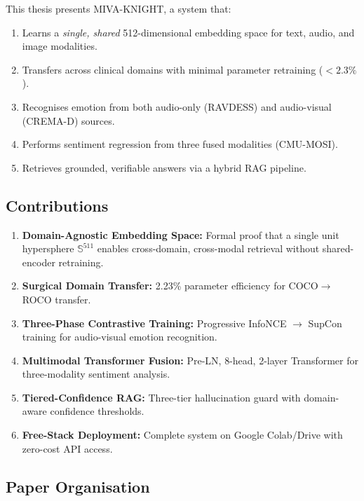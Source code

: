 \documentclass[12pt,a4paper]{article}
\theoremstyle{definition}
\theoremstyle{plain}
\theoremstyle{remark}
\newcommand{\Sph}{\mathbb{S}}
\begin{document}
This thesis presents MIVA-KNIGHT, a system that:
\begin{enumerate}
  \item Learns a \emph{single, shared} 512-dimensional embedding space for text, audio, and image modalities.
  \item Transfers across clinical domains with minimal parameter retraining ($< 2.3\%$).
  \item Recognises emotion from both audio-only (RAVDESS) and audio-visual (CREMA-D) sources.
  \item Performs sentiment regression from three fused modalities (CMU-MOSI).
  \item Retrieves grounded, verifiable answers via a hybrid RAG pipeline.
\end{enumerate}

\subsection{Contributions}

\begin{tcolorbox}[keybox,title={Summary of Contributions}]
\begin{enumerate}[label=\textbf{C\arabic*.}]
  \item \textbf{Domain-Agnostic Embedding Space:} Formal proof that a single unit hypersphere $\Sph^{511}$ enables cross-domain, cross-modal retrieval without shared-encoder retraining.
  \item \textbf{Surgical Domain Transfer:} 2.23\% parameter efficiency for COCO$\to$ROCO transfer.
  \item \textbf{Three-Phase Contrastive Training:} Progressive InfoNCE $\to$ SupCon training for audio-visual emotion recognition.
  \item \textbf{Multimodal Transformer Fusion:} Pre-LN, 8-head, 2-layer Transformer for three-modality sentiment analysis.
  \item \textbf{Tiered-Confidence RAG:} Three-tier hallucination guard with domain-aware confidence thresholds.
  \item \textbf{Free-Stack Deployment:} Complete system on Google Colab/Drive with zero-cost API access.
\end{enumerate}
\end{tcolorbox}

\subsection{Paper Organisation}
\end{document}
